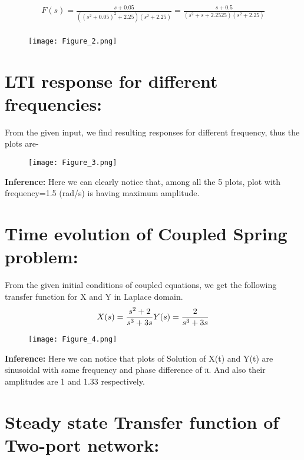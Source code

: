 \documentclass[12pt]{article}
\begin{document}
\begin{multline}  
F(s)=\frac{s + 0.05}{((s^2 + 0.05)^2 + 2.25)(s^2 + 2.25)}=\frac{s + 0.5}{(s^2 + s + 2.2525)(s^2 + 2.25)}\\
\end{multline}

\begin{figure}[h!]
\centering
\texttt{[image: Figure\_2.png]}
\end{figure}

\newpage
\section*{LTI response for different frequencies:}

From the given input, we find resulting responses for different frequency, thus the plots are-\\

\begin{figure}[h!]
\centering
\texttt{[image: Figure\_3.png]}
\label{fig:exemplo}
\end{figure}

\textbf{Inference:} Here we can clearly notice that, among all the 5 plots, plot with frequency=1.5 (rad/s) is having maximum amplitude.

\newpage
\section*{Time evolution of Coupled Spring problem: }

From the given initial conditions of coupled equations, we get the following transfer function for X and Y in Laplace domain.
\begin{multline}  
\newline X(s)=\frac{s^2 + 2}{s^3 + 3s}
\newline Y(s)=\frac{2}{s^3 + 3s}\\
\end{multline}

\begin{figure}[h!]
\centering
\texttt{[image: Figure\_4.png]}
\label{fig:exemplo}
\end{figure}

\textbf{Inference:} Here we can notice that plots of Solution of X(t) and Y(t) are sinusoidal with same frequency and phase difference of π. And also their amplitudes are 1 and 1.33 respectively.

\newpage
\section*{Steady state Transfer function of Two-port network:}
\end{document}
